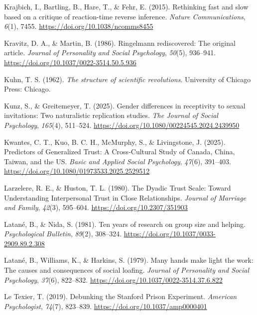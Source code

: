 \documentclass[
  letterpaper,
]{book}
\newlength{\cslhangindent}
\newenvironment{CSLReferences}[2] %
 {\begin{list}{}{%
  \setlength{\itemindent}{0pt}
  \setlength{\leftmargin}{0pt}
  \setlength{\parsep}{0pt}
  \ifodd #1
   \setlength{\leftmargin}{\cslhangindent}
   \setlength{\itemindent}{-1\cslhangindent}
  \fi
  \setlength{\itemsep}{#2\baselineskip}}}
 {\end{list}}
\begin{document}
\begin{CSLReferences}{1}{0}
Krajbich, I., Bartling, B., Hare, T., \& Fehr, E. (2015). Rethinking
fast and slow based on a critique of reaction-time reverse inference.
\emph{Nature Communications}, \emph{6}(1), 7455.
\url{https://doi.org/10.1038/ncomms8455}

Kravitz, D. A., \& Martin, B. (1986). Ringelmann rediscovered: {The}
original article. \emph{Journal of Personality and Social Psychology},
\emph{50}(5), 936--941. \url{https://doi.org/10.1037/0022-3514.50.5.936}

Kuhn, T. S. (1962). \emph{{The structure of scientific revolutions}}.
{University of Chicago Press: Chicago}.

Kunz, S., \& Greitemeyer, T. (2025). Gender differences in receptivity
to sexual invitations: Two naturalistic replication studies. \emph{The
Journal of Social Psychology}, \emph{165}(4), 511--524.
\url{https://doi.org/10.1080/00224545.2024.2439950}

Kwantes, C. T., Kuo, B. C. H., McMurphy, S., \& Livingstone, J. (2025).
Predictors of {Generalized} {Trust}: {A} {Cross}-{Cultural} {Study} of
{Canada}, {China}, {Taiwan}, and the {US}. \emph{Basic and Applied
Social Psychology}, \emph{47}(6), 391--403.
\url{https://doi.org/10.1080/01973533.2025.2529512}

Larzelere, R. E., \& Huston, T. L. (1980). The {Dyadic} {Trust} {Scale}:
{Toward} {Understanding} {Interpersonal} {Trust} in {Close}
{Relationships}. \emph{Journal of Marriage and Family}, \emph{42}(3),
595--604. \url{https://doi.org/10.2307/351903}

Latané, B., \& Nida, S. (1981). Ten years of research on group size and
helping. \emph{Psychological Bulletin}, \emph{89}(2), 308--324.
\url{https://doi.org/10.1037/0033-2909.89.2.308}

Latané, B., Williams, K., \& Harkins, S. (1979). Many hands make light
the work: {The} causes and consequences of social loafing. \emph{Journal
of Personality and Social Psychology}, \emph{37}(6), 822--832.
\url{https://doi.org/10.1037/0022-3514.37.6.822}

Le Texier, T. (2019). Debunking the {Stanford} {Prison} {Experiment}.
\emph{American Psychologist}, \emph{74}(7), 823--839.
\url{https://doi.org/10.1037/amp0000401}


\end{CSLReferences}
\end{document}
